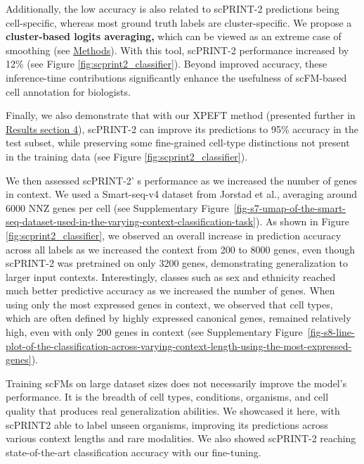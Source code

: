 Additionally, the low accuracy is also related to \gls{scPRINT}-2 predictions
being cell-specific, whereas most ground truth labels are
cluster-specific. We propose a \textbf{cluster-based logits averaging,}
which can be viewed as an extreme case of smoothing (see
\hyperref[cluster-aggregation]{Methods}). With this tool, \gls{scPRINT}-2
performance increased by 12\% (see Figure \ref{fig:scprint2_classifier}). Beyond improved accuracy,
these inference-time contributions significantly enhance the usefulness
of scFM-based cell annotation for biologists.

Finally, we also demonstrate that with our XPEFT method (presented
further in
\hyperref[an-efficient-hierarchical-attention-architecture-makes-scprint-2-generative]{Results
section 4}), \gls{scPRINT}-2 can improve its predictions to 95\% accuracy in
the test subset, while preserving some fine-grained cell-type
distinctions not present in the training data (see Figure \ref{fig:scprint2_classifier}).

We then assessed \gls{scPRINT}-2' s performance as we increased
the number of genes in context. We used a Smart-seq-v4 dataset from
Jorstad et al., averaging around 6000 \gls{NNZ} genes per cell (see Supplementary
Figure~\ref{fig-s7-umap-of-the-smart-seq-dataset-used-in-the-varying-context-classification-task})\citep{jorstadTranscriptomicCytoarchitectureReveals2023}. As shown in Figure \ref{fig:scprint2_classifier}, we observed an
overall increase in prediction accuracy across all labels as we
increased the context from 200 to 8000 genes, even though \gls{scPRINT}-2 was
pretrained on only 3200 genes, demonstrating generalization to larger
input contexts. Interestingly, classes such as sex and ethnicity reached
much better predictive accuracy as we increased the number of genes.
When using only the most expressed genes in context, we observed that
cell types, which are often defined by highly expressed canonical genes,
remained relatively high, even with only 200 genes in context (see Supplementary
Figure~\ref{fig-s8-line-plot-of-the-classification-across-varying-context-length-using-the-most-expressed-genes}).

Training \gls{scFM}s on large dataset sizes does not necessarily improve the
model's performance. It is the breadth of cell types, conditions,
organisms, and cell quality that produces real generalization abilities.
We showcased it here, with scPRINT2 able to label unseen organisms,
improving its predictions across various context lengths and rare
modalities. We also showed \gls{scPRINT}-2 reaching state-of-the-art
classification accuracy with our fine-tuning.

